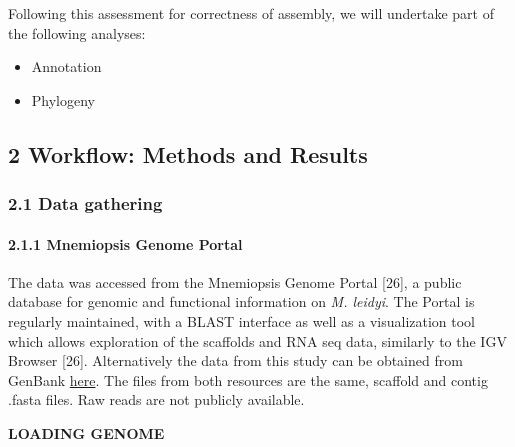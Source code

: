 \documentclass[
]{article}
\providecommand{\tightlist}{%
  \setlength{\itemsep}{0pt}\setlength{\parskip}{0pt}}
\begin{document}
Following this assessment for correctness of assembly, we will undertake
part of the following analyses:

\begin{itemize}
\tightlist
\item
  Annotation
\item
  Phylogeny
\end{itemize}

\hypertarget{workflow-methods-and-results}{%
\subsection{2 Workflow: Methods and
Results}\label{workflow-methods-and-results}}

\hypertarget{data-gathering}{%
\subsubsection{2.1 Data gathering}\label{data-gathering}}

\hypertarget{mnemiopsis-genome-portal}{%
\paragraph{2.1.1 Mnemiopsis Genome
Portal}\label{mnemiopsis-genome-portal}}

The data was accessed from the Mnemiopsis Genome Portal {[}26{]}, a
public database for genomic and functional information on \emph{M.
leidyi}. The Portal is regularly maintained, with a BLAST interface as
well as a visualization tool which allows exploration of the scaffolds
and RNA seq data, similarly to the IGV Browser {[}26{]}. Alternatively
the data from this study can be obtained from GenBank
\href{https://www.ncbi.nlm.nih.gov/assembly/GCA_000226015.1}{here}. The
files from both resources are the same, scaffold and contig .fasta
files. Raw reads are not publicly available.

\textbf{LOADING GENOME}
\end{document}
